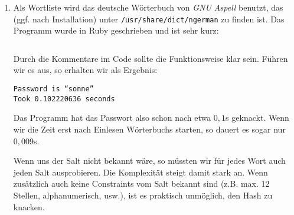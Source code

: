 \documentclass[a4paper,11pt]{scrartcl}
\begin{document}
\begin{enumerate}[2.]
    \item
        Als Wortliste wird das deutsche Wörterbuch von \textit{GNU Aspell}
        benutzt, das (ggf. nach Installation) unter
        \texttt{/usr/share/dict/ngerman} zu finden ist. Das Programm wurde in
        Ruby geschrieben und ist sehr kurz:

        \inputminted[linenos,numbersep=12pt,autogobble,frame=lines,framesep=2mm]%
                    {ruby}{pwcrack.rb}

        Durch die Kommentare im Code sollte die Funktionsweise klar sein. Führen
        wir es aus, so erhalten wir als Ergebnis:

        \texttt{Password is ``sonne''}\\
        \texttt{Took 0.102220636 seconds}

        Das Programm hat das Passwort also schon nach etwa $0,1$s geknackt. Wenn
        wir die Zeit erst nach Einlesen Wörterbuchs starten, so dauert es sogar
        nur $0,009$s.

        Wenn uns der Salt nicht bekannt wäre, so müssten wir für jedes Wort auch
        jeden Salt ausprobieren. Die Komplexität steigt damit stark an. Wenn
        zusätzlich auch keine Constraints vom Salt bekannt sind (z.B. max. 12
        Stellen, alphanumerisch, usw.), ist es praktisch unmöglich, den Hash zu
        knacken.
\end{enumerate}
\end{document}
